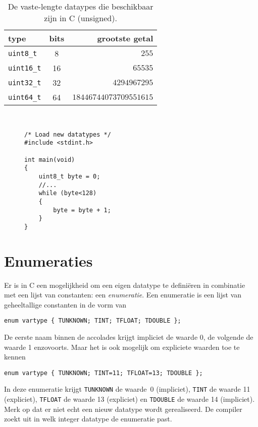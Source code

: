 \begin{table}[!ht]
\centering
\caption{De vaste-lengte dataypes die beschikbaar zijn in C (unsigned).}
\label{tab:varuinttdatatypes}
\begin{tabular}{@{}lcr@{}}
\toprule
\textbf{type}          & \textbf{bits} & \textbf{grootste getal} \\ \midrule
\texttt{uint8\_t}       & 8             & $255$                   \\
\texttt{uint16\_t}      & 16            & $65535$                 \\
\texttt{uint32\_t}      & 32            & $4294967295$            \\
\texttt{uint64\_t}      & 64            & $18446744073709551615$   \\
\bottomrule
\end{tabular}\\
\end{table}

\begin{figure}[!ht]
\begin{lstlisting}[caption=Voorbeeld van het gebruik van vaste-lengte datatypes.,label=cod:vastelengte]
/* Load new datatypes */
#include <stdint.h>

int main(void)
{
    uint8_t byte = 0;
    //...
    while (byte<128)
    {
        byte = byte + 1;
    }
}
\end{lstlisting}
\end{figure}


\section{Enumeraties}
Er is in C een mogelijkheid om een eigen datatype te definiëren in combinatie met een lijst van constanten: een \textsl{enumeratie}. Een enumeratie is een lijst van geheeltallige constanten in de vorm van

\hspace*{1em}\texttt{enum vartype \{ TUNKNOWN; TINT; TFLOAT; TDOUBLE \};}

De eerste naam binnen de accolades krijgt impliciet de waarde 0, de volgende de waarde 1 enzovoorts. Maar het is ook mogelijk om expliciete waarden toe te kennen

\hspace*{1em}\texttt{enum vartype \{ TUNKNOWN; TINT=11; TFLOAT=13; TDOUBLE \};}

In deze enumeratie krijgt \texttt{TUNKNOWN} de waarde~0 (impliciet), \texttt{TINT} de waarde 11 (expliciet), \texttt{TFLOAT} de waarde 13 (expliciet) en \texttt{TDOUBLE} de waarde 14 (impliciet). Merk op dat er niet echt een nieuw datatype wordt gerealiseerd. De compiler zoekt uit in welk integer datatype de enumeratie past.


